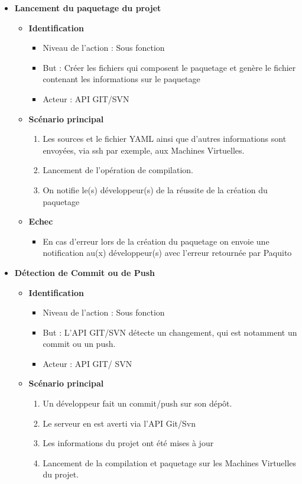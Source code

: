 \documentclass[12pt,a4paper]{article}
\begin{document}
\begin{itemize}
\item\textbf{\large Lancement du paquetage du projet}
  \begin{itemize}
  \item \textbf{Identification}
    \begin{itemize}
    \item[] Niveau de l'action : Sous fonction
    \item[] But : Créer les fichiers qui composent le paquetage et genère le fichier contenant les informations sur le paquetage
    \item[] Acteur : API GIT/SVN
    \end{itemize}
  \item \textbf{Scénario principal}
    \begin{enumerate}
    \item Les sources et le fichier YAML ainsi que d'autres informations sont envoyées, via ssh par exemple, aux Machines Virtuelles.
    \item Lancement de l'opération de compilation.
    \item On notifie le(s) développeur(s) de la réussite de la création du paquetage
    \end{enumerate}
  \item \textbf{Echec}
    \begin{itemize}
    \item En cas d'erreur lors de la création du paquetage on envoie une notification au(x) développeur(s) avec l'erreur retournée par Paquito
    \end{itemize}
  \end{itemize}
  
\item\textbf{\large Détection de Commit ou de Push}
  \begin{itemize}
  \item \textbf{Identification}
    \begin{itemize}
    \item[] Niveau de l'action : Sous fonction
    \item[] But : L’API GIT/SVN détecte un changement, qui est notamment un commit ou un push.
    \item[] Acteur : API GIT/ SVN
    \end{itemize}
  \item \textbf{Scénario principal}
    \begin{enumerate}
    \item Un développeur fait un commit/push sur son dépôt.
    \item Le serveur en est averti via l’API Git/Svn
    \item Les informations du projet ont été mises à jour
    \item Lancement de la compilation et paquetage sur les Machines Virtuelles du projet.
    \end{enumerate}
  \end{itemize}


\end{itemize}
\end{document}
